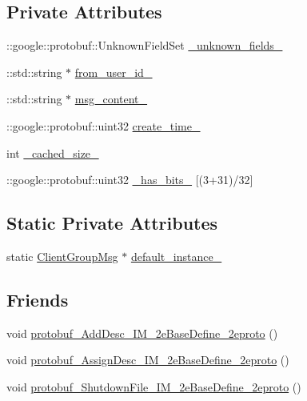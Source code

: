 \subsection*{Private Attributes}
\begin{DoxyCompactItemize}
\item 
\+::google\+::protobuf\+::\+Unknown\+Field\+Set \hyperlink{class_i_m_1_1_base_define_1_1_client_group_msg_ac92a28ad7a401d3a08bf052e2a269eb2}{\+\_\+unknown\+\_\+fields\+\_\+}
\item 
\+::std\+::string $\ast$ \hyperlink{class_i_m_1_1_base_define_1_1_client_group_msg_a1e345ba7510faf7ba23bce6db8d3f9f5}{from\+\_\+user\+\_\+id\+\_\+}
\item 
\+::std\+::string $\ast$ \hyperlink{class_i_m_1_1_base_define_1_1_client_group_msg_a595d9562408c010673df7d09ab8e2521}{msg\+\_\+content\+\_\+}
\item 
\+::google\+::protobuf\+::uint32 \hyperlink{class_i_m_1_1_base_define_1_1_client_group_msg_a572fb699d7f4386039f079f68a4a3e8c}{create\+\_\+time\+\_\+}
\item 
int \hyperlink{class_i_m_1_1_base_define_1_1_client_group_msg_a6e0a6eee05ac8d63a5e87aa4b1e2d0f4}{\+\_\+cached\+\_\+size\+\_\+}
\item 
\+::google\+::protobuf\+::uint32 \hyperlink{class_i_m_1_1_base_define_1_1_client_group_msg_a66b9aef64a7ca84e0b9e8e7244f01b40}{\+\_\+has\+\_\+bits\+\_\+} \mbox{[}(3+31)/32\mbox{]}
\end{DoxyCompactItemize}
\subsection*{Static Private Attributes}
\begin{DoxyCompactItemize}
\item 
static \hyperlink{class_i_m_1_1_base_define_1_1_client_group_msg}{Client\+Group\+Msg} $\ast$ \hyperlink{class_i_m_1_1_base_define_1_1_client_group_msg_a55804c175a2652beb6cf56a9f47d497e}{default\+\_\+instance\+\_\+}
\end{DoxyCompactItemize}
\subsection*{Friends}
\begin{DoxyCompactItemize}
\item 
void \hyperlink{class_i_m_1_1_base_define_1_1_client_group_msg_a9e69e602ccebaa03e642ca43da69b2eb}{protobuf\+\_\+\+Add\+Desc\+\_\+\+I\+M\+\_\+2e\+Base\+Define\+\_\+2eproto} ()
\item 
void \hyperlink{class_i_m_1_1_base_define_1_1_client_group_msg_a2c5118df3e7622ff896b422106a76fef}{protobuf\+\_\+\+Assign\+Desc\+\_\+\+I\+M\+\_\+2e\+Base\+Define\+\_\+2eproto} ()
\item 
void \hyperlink{class_i_m_1_1_base_define_1_1_client_group_msg_aa7f5f65378aed5daf4141184fe892bcf}{protobuf\+\_\+\+Shutdown\+File\+\_\+\+I\+M\+\_\+2e\+Base\+Define\+\_\+2eproto} ()
\end{DoxyCompactItemize}


